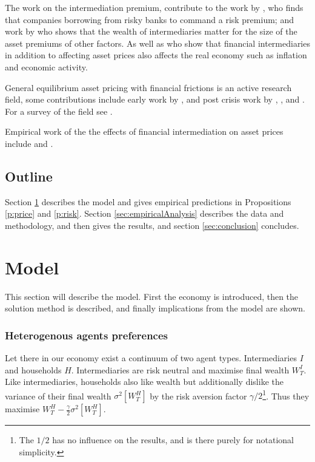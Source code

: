 \documentclass[11pt]{article}
\begin{document}
The work on the intermediation premium, contribute to the work by \citet{Marchuk2017}, who finds that companies borrowing from risky banks to command a risk premium; and work by \citet{Adrian2014} who shows that the wealth of intermediaries matter for the size of the asset premiums of other factors. As well as \citet{Adrian2010} who show that financial intermediaries in addition to affecting asset prices also affects the real economy such as inflation and economic activity.

General equilibrium asset pricing with financial frictions is an active research field, some contributions include early work by \citet{Geanakoplos1997, geanakoplos2003}, and post crisis work by \citet{Brunnermeier2009}, \citet{He2013}, and \citet{Brunnermeier2014}. For a survey of the field see \citet{Brunnermeier2013}.

Empirical work of the the effects of financial intermediation on asset prices include \citet{Adrian2010,Adrian2014} and \citet{Marchuk2017}.

\subsection*{Outline}

Section \ref{sec:model} describes the model and gives empirical predictions in Propositions \ref{p:price} and \ref{p:risk}. Section \ref{sec:empiricalAnalysis} describes the data and methodology, and then gives %
the results, and section \ref{sec:conclusion} concludes.




\section{Model} \label{sec:model}

This section will describe the model. First the economy is introduced, then the solution method is described, and finally implications from the model are shown.

\subsubsection*{Heterogenous agents preferences}

Let there in our economy exist a continuum of two agent types. Intermediaries $I$ and households $H$. Intermediaries are risk neutral and maximise final wealth $W^I_T$. Like intermediaries, households also like wealth but additionally dislike the variance of their final wealth $\sigma^2[W^H_T]$ by the risk aversion factor $\gamma/2$\footnote{The $1/2$ has no influence on the results, and is there purely for notational simplicity.}. Thus they maximise $W^H_T - \frac{\gamma}{2}\sigma^2[W^H_T]$.
\end{document}

